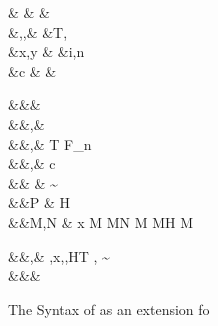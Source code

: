 \documentclass[manuscript,screen,nonacm]{acmart}
\begin{document}
\begin{figure}[h]
  \centering
  \begin{syntax}
     &\shl{\chi}   &                            & \\
     &\alpha,\beta,\Co  &\qquad{} &T, \\
     &x,y                  &\qquad{}        &i,n \in {} \\
     &c & &
  \end{syntax}
  \begin{syntax}
          &&\square & \\
         &&\kappa,\eta       \bnfeq& \shl{\chi} \bnfor \STAR \bnfor {} \bnfor \kappa \to \kappa \bnfor {}\\
         &&\tau,\sigma  \bnfeq& \alpha \bnfor T \bnfor \tau \to \tau \bnfor \tau\App\tau \bnfor \Forall {\alpha\co\kappa} \tau \bnfor F_n \bnfor \shl{\Forall \chi \tau} \bnfor \shl{\tau\App\kappa} \bnfor {}\\
     &&\nu,\Co      \bnfeq& c \bnfor {}\tau \bnfor \Sym\Co \bnfor \trans\nu\Co %
                                      \bnfor \Forall {\alpha\co\kappa} \Co \bnfor \Co\At\tau %
                                      \bnfor \nu\App\Co \bnfor \Left \Co \bnfor \Right \Co  %
                                      \bnfor \shl{\Forall \chi \Co} \bnfor \shl{\Co\App\chi} %
                                      \bnfor \shl{\Co\At\chi}\\
     && \phi \bnfeq& \sigma \sim \tau\\
      &&P    \bnfeq& H\App\shl{\many\chi}\App\many{\alpha\co\kappa} \\
         &&M,N  \bnfeq& x \bnfor  {} M \bnfor M\App N \bnfor \TLam{\tau\co\kappa} M \bnfor M\App \tau \bnfor H \bnfor \Case M  \bnfor \Cast \Tm \Co %
                             \bnfor \shl{\TLam \chi \Tm} \bnfor \shl{\Tm\App\kappa} \\

    \end{syntax}
    \begin{syntax}
     &&\TEnv,\Delta \bnfeq& \empt \bnfor \TEnv,x\co\tau \bnfor \TEnv,\alpha\co\kappa \bnfor \TEnv,H\co T \bnfor \TEnv, \Co \co \tau\sim\sigma\\
      &&\Subst       \bnfeq& \empt \bnfor \Set{\many{\alpha \mapsto \tau}}
  \end{syntax} 
  \caption{The Syntax of \SFP as an extension fo \SFR}
  \label{fig:sfp-syntax}
\end{figure}
\end{document}
